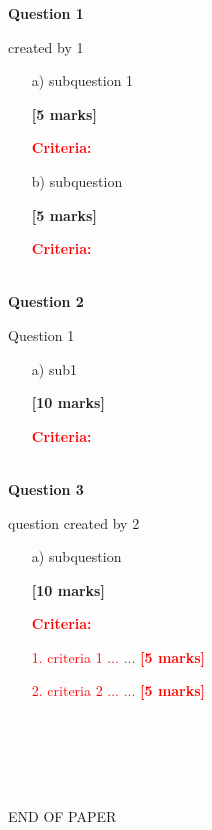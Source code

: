 \documentclass[11pt]{article}
\begin{document}
	\pagestyle{fancy}
	\fancyhf{}
	
	\setcounter{page}{1}
	
	
        \textbf{Question 1}

        created by 1
        \begin{enumerate}
            
        \item[a) ]subquestion 1
        \begin{flushright}
            \textbf{[5 marks]}
        \end{flushright}

        \textcolor{red}{\textbf{Criteria:}}
    
        \item[b) ]subquestion
        \begin{flushright}
            \textbf{[5 marks]}
        \end{flushright}

        \textcolor{red}{\textbf{Criteria:}}
    
        \end{enumerate}
        ~\\
    
        \textbf{Question 2}

        Question 1
        \begin{enumerate}
            
        \item[a) ]sub1
        \begin{flushright}
            \textbf{[10 marks]}
        \end{flushright}

        \textcolor{red}{\textbf{Criteria:}}
    
        \end{enumerate}
        ~\\
    
        \textbf{Question 3}

        question created by 2
        \begin{enumerate}
            
        \item[a) ]subquestion
        \begin{flushright}
            \textbf{[10 marks]}
        \end{flushright}

        \textcolor{red}{\textbf{Criteria:}}
    
        \setlength{\parindent}{2em}\textcolor{red}{1. criteria 1 ... ... \textbf{[5 marks]}}
    
        \setlength{\parindent}{2em}\textcolor{red}{2. criteria 2 ... ... \textbf{[5 marks]}}
    
        \end{enumerate}
        ~\\
    
	
	
	~\\~\\~\\
	\begin{center}
		END OF PAPER
	\end{center}
	
	
	\label{unknown}
\end{document}
